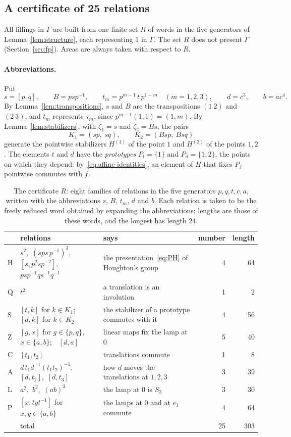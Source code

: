 \subsection{A certificate of 25 relations}\label{sec:certificate}

All fillings in $\Gamma$ are built from one finite set $R$ of words in the five generators of Lemma~\ref{lem:structure}, each representing $1$
in $\Gamma$. The set $R$ does not present $\Gamma$ (Section~\ref{sec:fp}). Areas are always taken with respect to $R$.

\paragraph{Abbreviations.} Put
\[
s=[p,q],\qquad B=psp^{-1},\qquad t_m=p^{m-1}\,t\,p^{1-m}\quad(m=1,2,3),\qquad d=c^3,\qquad b=ac^4 .
\]
By Lemma~\ref{lem:transpositions}, $s$ and $B$ are the transpositions $(1\ 2)$ and $(2\ 3)$, and $t_m$ represents $\tau_m$, since
$p^{m-1}(1,1)=(1,m)$. By Lemma~\ref{lem:stabilizers}, with $\zeta_1=s$ and $\zeta_2=Bs$, the pairs
\[
K_1=(sp,\ sq),\qquad K_2=(Bsp,\ Bsq)
\]
generate the pointwise stabilizers $H^{(1)}$ of the point $1$ and $H^{(2)}$ of the points $1,2$. The elements $t$ and $d$ have the
\emph{prototypes} $P_t=\{1\}$ and $P_d=\{1,2\}$, the points on which they depend: by~\eqref{eq:affine-identities}, an element of $H$ that fixes
$P_f$ pointwise commutes with $f$.

\begin{table}[ht]
\centering\small
\begin{tabular}{@{}l p{} p{} r r@{}}
\toprule
 & relations & says & number & length\tabularnewline
\midrule
\textsf{H} & \raggedright $s^2$,\ $(sps\,p^{-1})^3$,\ $[s,p^2sp^{-2}]$,\ $psp^{-1}qs^{-1}q^{-1}$ & \raggedright the presentation~\eqref{eq:PH} of Houghton's group & 4 & 64\tabularnewline
\textsf{Q} & \raggedright $t^2$ & \raggedright a translation is an involution & 1 & 2\tabularnewline
\textsf{S} & \raggedright $[t,k]$ for $k\in K_1$;\ \ $[d,k]$ for $k\in K_2$ & \raggedright the stabilizer of a prototype commutes with it & 4 & 56\tabularnewline
\textsf{Z} & \raggedright $[g,x]$ for $g\in\{p,q\}$, $x\in\{a,b\}$;\ \ $[d,a]$ & \raggedright linear maps fix the lamp at $0$ & 5 & 40\tabularnewline
\textsf{C} & \raggedright $[t_1,t_2]$ & \raggedright translations commute & 1 & 8\tabularnewline
\textsf{A} & \raggedright $d\,t_1d^{-1}(t_1t_2)^{-1}$,\ $[d,t_2]$,\ $[d,t_3]$ & \raggedright how $d$ moves the translations at $1,2,3$ & 3 & 39\tabularnewline
\textsf{L} & \raggedright $a^2$,\ $b^2$,\ $(ab)^3$ & \raggedright the lamp at $0$ is $S_3$ & 3 & 30\tabularnewline
\textsf{P} & \raggedright $[x,tyt^{-1}]$ for $x,y\in\{a,b\}$ & \raggedright the lamps at $0$ and at $e_1$ commute & 4 & 64\tabularnewline
\midrule
 & total & & 25 & 303\tabularnewline
\bottomrule
\end{tabular}
\caption{The certificate $R$: eight families of relations in the five generators $p,q,t,c,a$, written with the abbreviations $s$, $B$, $t_m$,
$d$ and $b$. Each relation is taken to be the freely reduced word obtained by expanding the abbreviations; lengths are those of these words, and
the longest has length $24$.}
\label{tab:certificate}
\end{table}

